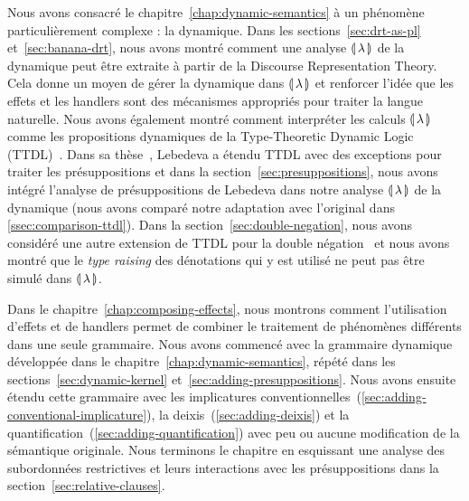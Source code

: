 Nous avons consacré le chapitre~\ref{chap:dynamic-semantics} à un phénomène
particulièrement complexe : la dynamique. Dans les sections~\ref{sec:drt-as-pl}
et~\ref{sec:banana-drt}, nous avons montré comment une analyse ${\llparenthesis \, \lambda \, \rrparenthesis}$ de la
dynamique peut être extraite à partir de la Discourse Representation Theory.
Cela donne un moyen de gérer la dynamique dans ${\llparenthesis \, \lambda \, \rrparenthesis}$ et renforcer l'idée que
les effets et les handlers sont des mécanismes appropriés pour traiter la langue
naturelle. Nous avons également montré comment interpréter les calculs ${\llparenthesis \, \lambda \, \rrparenthesis}$
comme les propositions dynamiques de la Type-Theoretic Dynamic Logic
(TTDL)~\cite{de2006towards}. Dans sa thèse~\cite{lebedeva2012expression},
Lebedeva a étendu TTDL avec des exceptions pour traiter les présuppositions et
dans la section~\ref{sec:presuppositions}, nous avons intégré l'analyse de
présuppositions de Lebedeva dans notre analyse ${\llparenthesis \, \lambda \, \rrparenthesis}$ de la dynamique (nous
avons comparé notre adaptation avec l'original dans
\ref{ssec:comparison-ttdl}). Dans la section~\ref{sec:double-negation},
nous avons considéré une autre extension de TTDL pour la double
négation~\cite{qian2014accessibility} et nous avons montré que le \textit{type
  raising} des dénotations qui y est utilisé ne peut pas être simulé dans
${\llparenthesis \, \lambda \, \rrparenthesis}$.

Dans le chapitre~\ref{chap:composing-effects}, nous montrons comment l'utilisation d'effets et de handlers permet de
combiner le traitement de phénomènes différents dans une seule grammaire. Nous avons commencé
avec la grammaire dynamique développée dans le
chapitre~\ref{chap:dynamic-semantics}, répété dans les
sections~\ref{sec:dynamic-kernel} et~\ref{sec:adding-presuppositions}. Nous
avons ensuite étendu cette grammaire avec les implicatures
conventionnelles~(\ref{sec:adding-conventional-implicature}), la
deixis~(\ref{sec:adding-deixis}) et la
quantification~(\ref{sec:adding-quantification}) avec peu ou aucune modification
de la sémantique originale. Nous terminons le chapitre en esquissant une
analyse des subordonnées restrictives et leurs interactions avec les
présuppositions dans la section~\ref{sec:relative-clauses}.